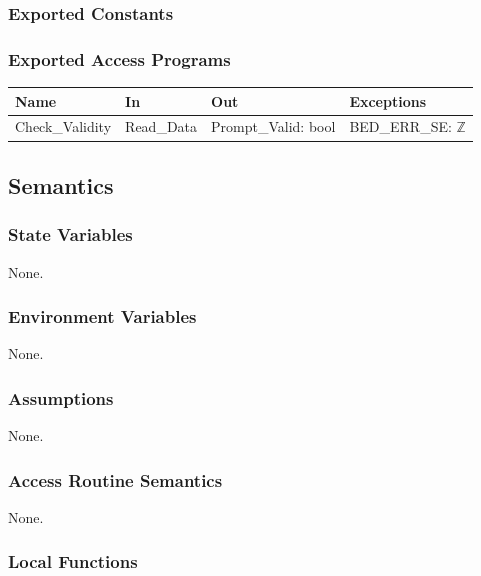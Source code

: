 \documentclass[12pt, titlepage]{article}
\begin{document}
\subsubsection{Exported Constants}

\subsubsection{Exported Access Programs}

\begin{center}
\begin{tabular}{p{3cm} p{2cm} p{4cm} p{4cm}}
\hline
\textbf{Name} & \textbf{In} & \textbf{Out} & \textbf{Exceptions} \\
\hline
Check\_Validity & Read\_Data & Prompt\_Valid: bool & BED\_ERR\_SE: $\mathbb{Z}$ \\
\hline
\end{tabular}
\end{center}

\subsection{Semantics}

\subsubsection{State Variables}
None.

\subsubsection{Environment Variables}
None.

\subsubsection{Assumptions}

None.

\subsubsection{Access Routine Semantics}
None.

\subsubsection{Local Functions}

\newpage

\end{document}

